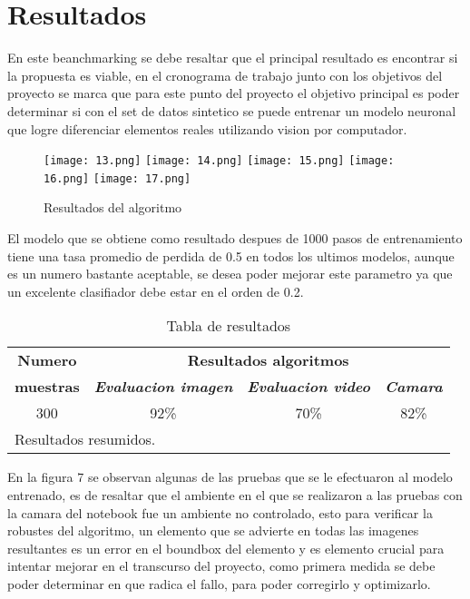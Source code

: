 \documentclass[conference]{IEEEtran}
\begin{document}
\section*{Resultados}
En este beanchmarking se debe resaltar que el principal resultado es encontrar si la propuesta es viable, en el cronograma de trabajo junto con los objetivos del proyecto se marca que para este punto del proyecto el objetivo principal es poder determinar si con el set de datos sintetico se puede entrenar un modelo neuronal que logre diferenciar elementos reales utilizando vision por computador.
\begin{figure}
	\centering
	\texttt{[image: 13.png]}
	\texttt{[image: 14.png]}
		\texttt{[image: 15.png]}
	\texttt{[image: 16.png]}
		\texttt{[image: 17.png]}
	\caption{Resultados del algoritmo}
	\label{fig:Resultado Groundtruth}
\end{figure}
El modelo que se obtiene como resultado despues de 1000 pasos de entrenamiento tiene una tasa promedio de perdida de 0.5 en todos los ultimos modelos, aunque es un numero bastante aceptable, se desea poder mejorar este parametro ya que un excelente clasifiador debe estar en el orden de 0.2.
\begin{table}[htbp]
	\caption{Tabla de resultados}
	\begin{center}
		\begin{tabular}{|c|c|c|c|}
			\hline
			\textbf{Numero}&\multicolumn{3}{|c|}{\textbf{Resultados algoritmos}} \\
			\cline{2-4} 
			\textbf{muestras} & \textbf{\textit{Evaluacion imagen}}& \textbf{\textit{Evaluacion video}}& \textbf{\textit{Camara}} \\
			\hline
			300& 92\%&70\% &82\%  \\
			\hline
			\multicolumn{4}{l}{Resultados resumidos.}
		\end{tabular}
		\label{tab1}
	\end{center}
\end{table}
En la figura 7 se observan algunas de las pruebas que se le efectuaron al modelo entrenado, es de resaltar que el ambiente en el que se realizaron a las pruebas con la camara del notebook fue un ambiente no controlado, esto para verificar la robustes del algoritmo, un elemento que se advierte en todas las imagenes resultantes es un error en el boundbox del elemento y es elemento crucial para intentar mejorar en el transcurso del proyecto, como primera medida se debe poder determinar en que radica el fallo, para poder corregirlo y optimizarlo.
\end{document}
